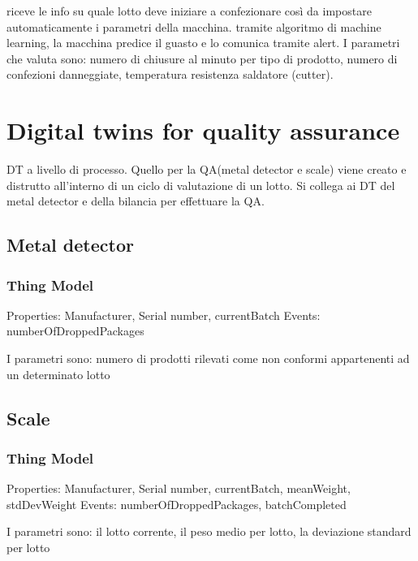 
riceve le info su quale lotto deve iniziare a confezionare così da impostare automaticamente i parametri della macchina.
tramite algoritmo di machine learning, la macchina predice il guasto e lo comunica tramite alert.
I parametri che valuta sono: numero di chiusure al minuto per tipo di prodotto, numero di confezioni danneggiate, temperatura resistenza saldatore (cutter).

\section{Digital twins for quality assurance}
DT a livello di processo. Quello per la QA(metal detector e scale) viene creato e distrutto all'interno di un ciclo di valutazione di un lotto.
Si collega ai DT del metal detector e della bilancia per effettuare la QA.
\subsection{Metal detector}
\subsubsection{Thing Model}
Properties: Manufacturer, Serial number, currentBatch
Events: numberOfDroppedPackages

I parametri sono:
numero di prodotti rilevati come non conformi appartenenti ad un determinato lotto

\subsection{Scale}
\subsubsection{Thing Model}
Properties: Manufacturer, Serial number, currentBatch, meanWeight, stdDevWeight
Events: numberOfDroppedPackages, batchCompleted

I parametri sono:
il lotto corrente, il peso medio per lotto, la deviazione standard per lotto
